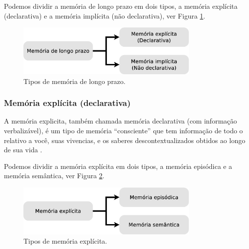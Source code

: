 Podemos dividir a memória de longo prazo em dois tipos, 
a memória explícita (declarativa) e 
a memória implícita (não declarativa), ver Figura \ref{fig:implicito-explicito}.
\begin{figure}[!h]
  \centering
    \includegraphics[width=0.8\textwidth]{chapters/cap-learning/memory-mlp.eps} 
  \caption{Tipos de  memória de longo prazo.}
\label{fig:implicito-explicito}
\end{figure}

\subsubsection{Memória explícita (declarativa)} 
\label{subsubsec:explicita}
A memória explicita, também chamada memória declarativa (com informação verbalizável),
é um tipo de memória ``consciente'' que tem informação de todo o relativo a você, 
suas vivencias, e os saberes descontextualizados obtidos ao longo de sua vida
\cite[pp. 138]{pake2019psicologia}.

Podemos dividir a memória explícita em dois tipos, 
a memória episódica e 
a memória semântica, ver Figura \ref{fig:semantica-episodica:explicita}.
\begin{figure}[!h]
  \centering
    \includegraphics[width=0.8\textwidth]{chapters/cap-learning/memory-explicita.eps} 
  \caption{Tipos de  memória explícita.}
\label{fig:semantica-episodica:explicita}
\end{figure}

